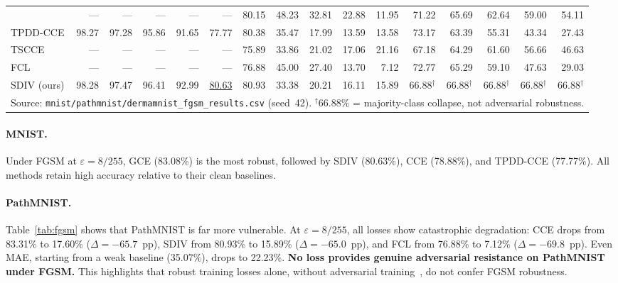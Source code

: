 \begin{table}[t]
\begin{tabular}{@{}l rrrrr | rrrrr | rrrrr@{}}
  & --- & --- & --- & --- & ---
  & 80.15 & 48.23 & 32.81 & 22.88 & 11.95
  & 71.22 & 65.69 & 62.64 & 59.00 & 54.11 \\
TPDD-CCE
  & 98.27 & 97.28 & 95.86 & 91.65 & 77.77
  & 80.38 & 35.47 & 17.99 & 13.59 & 13.58
  & 73.17 & 63.39 & 55.31 & 43.34 & 27.43 \\
TSCCE
  & --- & --- & --- & --- & ---
  & 75.89 & 33.86 & 21.02 & 17.06 & 21.16
  & 67.18 & 64.29 & 61.60 & 56.66 & 46.63 \\
FCL
  & --- & --- & --- & --- & ---
  & 76.88 & 45.00 & 27.40 & 13.70 &  7.12
  & 72.77 & 65.29 & 59.10 & 47.63 & 29.03 \\
SDIV (ours)
  & 98.28 & 97.47 & 96.41 & 92.99 & \underline{80.63}
  & 80.93 & 33.38 & 20.21 & 16.11 & 15.89
  & 66.88$^{\dagger}$ & 66.88$^{\dagger}$ & 66.88$^{\dagger}$ & 66.88$^{\dagger}$ & 66.88$^{\dagger}$ \\
\midrule
\multicolumn{16}{l}{%
  \footnotesize
  Source: \texttt{mnist/pathmnist/dermamnist\_fgsm\_results.csv} (seed~42).
  $^{\dagger}$66.88\% = majority-class collapse, not adversarial robustness.
} \\
\bottomrule
\end{tabular}
\end{table}

\paragraph{MNIST.}
Under FGSM at $\varepsilon{=}8/255$, GCE (83.08\%) is the most robust,
followed by SDIV (80.63\%), CCE (78.88\%), and TPDD-CCE (77.77\%).
All methods retain high accuracy relative to their clean baselines.

\paragraph{PathMNIST.}
Table~\ref{tab:fgsm} shows that PathMNIST is far more vulnerable.
At $\varepsilon{=}8/255$, all losses show catastrophic degradation:
CCE drops from 83.31\% to 17.60\% ($\Delta{=}{-65.7}$~pp),
SDIV from 80.93\% to 15.89\% ($\Delta{=}{-65.0}$~pp), and
FCL from 76.88\% to 7.12\% ($\Delta{=}{-69.8}$~pp).
Even MAE, starting from a weak baseline (35.07\%), drops to 22.23\%.
\textbf{No loss provides genuine adversarial resistance on PathMNIST under FGSM.}
This highlights that robust training losses alone, without adversarial
training~\citep{madry2018}, do not confer FGSM robustness.

